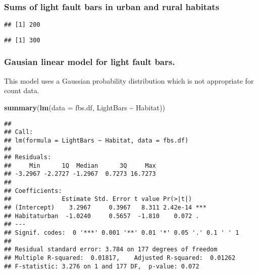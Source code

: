 \documentclass[
]{article}
\newenvironment{Shaded}{\begin{snugshade}}{\end{snugshade}}
\newcommand{\AttributeTok}[1]{\textcolor[rgb]{0.13,0.29,0.53}{#1}}
\newcommand{\CommentTok}[1]{\textcolor[rgb]{0.56,0.35,0.01}{\textit{#1}}}
\newcommand{\FunctionTok}[1]{\textcolor[rgb]{0.13,0.29,0.53}{\textbf{#1}}}
\newcommand{\NormalTok}[1]{#1}
\newcommand{\SpecialCharTok}[1]{\textcolor[rgb]{0.81,0.36,0.00}{\textbf{#1}}}
\newcommand{\StringTok}[1]{\textcolor[rgb]{0.31,0.60,0.02}{#1}}
\begin{document}
\subsubsection{Sums of light fault bars in urban and rural
habitats}\label{sums-of-light-fault-bars-in-urban-and-rural-habitats}

\begin{Shaded}
\end{Shaded}

\begin{verbatim}
## [1] 200
\end{verbatim}

\begin{Shaded}
\end{Shaded}

\begin{verbatim}
## [1] 300
\end{verbatim}

\subsubsection{Gausian linear model for light fault
bars.}\label{gausian-linear-model-for-light-fault-bars.}

This model uses a Gaussian probability distribution which is not
appropriate for count data.

\begin{Shaded}
\begin{Highlighting}[]
\FunctionTok{summary}\NormalTok{(}\FunctionTok{lm}\NormalTok{(}\AttributeTok{data =}\NormalTok{ fbs.df, LightBars }\SpecialCharTok{\textasciitilde{}}\NormalTok{ Habitat))}
\end{Highlighting}
\end{Shaded}

\begin{verbatim}
## 
## Call:
## lm(formula = LightBars ~ Habitat, data = fbs.df)
## 
## Residuals:
##     Min      1Q  Median      3Q     Max 
## -3.2967 -2.2727 -1.2967  0.7273 16.7273 
## 
## Coefficients:
##              Estimate Std. Error t value Pr(>|t|)    
## (Intercept)    3.2967     0.3967   8.311 2.42e-14 ***
## Habitaturban  -1.0240     0.5657  -1.810    0.072 .  
## ---
## Signif. codes:  0 '***' 0.001 '**' 0.01 '*' 0.05 '.' 0.1 ' ' 1
## 
## Residual standard error: 3.784 on 177 degrees of freedom
## Multiple R-squared:  0.01817,    Adjusted R-squared:  0.01262 
## F-statistic: 3.276 on 1 and 177 DF,  p-value: 0.072
\end{verbatim}
\end{document}
